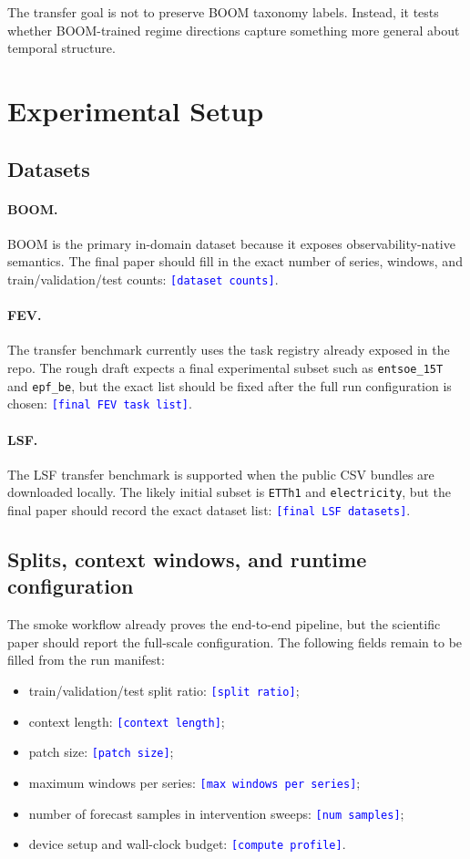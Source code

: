 \documentclass{article}
\newcommand{\tbd}[1]{\textcolor{blue}{\texttt{[#1]}}}
\newcommand{\boom}{\textsc{BOOM}}
\newcommand{\fev}{\textsc{FEV}}
\newcommand{\lsf}{\textsc{LSF}}
\begin{document}
The transfer goal is not to preserve \boom{} taxonomy labels. Instead, it tests whether \boom{}-trained regime directions capture something more general about temporal structure.

\section{Experimental Setup}
\label{sec:setup}

\subsection{Datasets}

\paragraph{\boom{}.}
\boom{} is the primary in-domain dataset because it exposes observability-native semantics. The final paper should fill in the exact number of series, windows, and train/validation/test counts: \tbd{dataset counts}.

\paragraph{\fev{}.}
The transfer benchmark currently uses the task registry already exposed in the repo. The rough draft expects a final experimental subset such as \texttt{entsoe\_15T} and \texttt{epf\_be}, but the exact list should be fixed after the full run configuration is chosen: \tbd{final FEV task list}.

\paragraph{\lsf{}.}
The \lsf{} transfer benchmark is supported when the public CSV bundles are downloaded locally. The likely initial subset is \texttt{ETTh1} and \texttt{electricity}, but the final paper should record the exact dataset list: \tbd{final LSF datasets}.

\subsection{Splits, context windows, and runtime configuration}

The smoke workflow already proves the end-to-end pipeline, but the scientific paper should report the full-scale configuration. The following fields remain to be filled from the run manifest:
\begin{itemize}[leftmargin=18pt]
\item train/validation/test split ratio: \tbd{split ratio};
\item context length: \tbd{context length};
\item patch size: \tbd{patch size};
\item maximum windows per series: \tbd{max windows per series};
\item number of forecast samples in intervention sweeps: \tbd{num samples};
\item device setup and wall-clock budget: \tbd{compute profile}.
\end{itemize}
\end{document}
